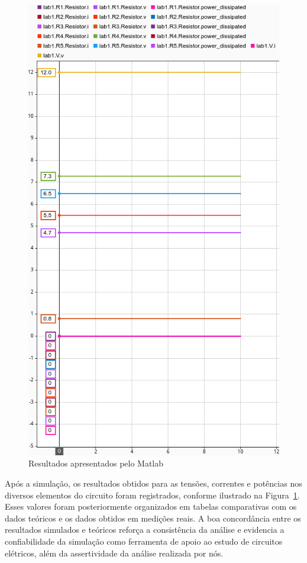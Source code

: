 \begin{figure}[H]
  \centering
  \includegraphics[width=0.7\linewidth]{fig/lab1results.png}
  \caption{Resultados apresentados pelo Matlab}
  \label{fig:simulink-results}
\end{figure}

Após a simulação, os resultados obtidos para as tensões, correntes e potências
nos diversos elementos do circuito foram registrados, conforme ilustrado na
Figura~\ref{fig:simulink-results}. Esses valores foram posteriormente
organizados em tabelas comparativas com os dados teóricos e os dados obtidos em
medições reais. A boa concordância entre os resultados simulados e teóricos
reforça a consistência da análise e evidencia a confiabilidade da simulação como
ferramenta de apoio ao estudo de circuitos elétricos, além da assertividade da
análise realizada por nós.
